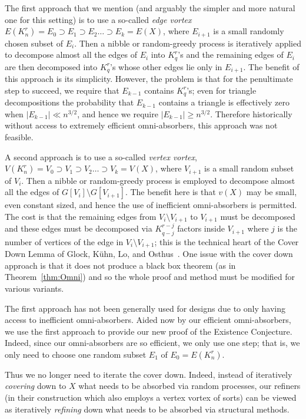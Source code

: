 \documentclass[11pt]{article}
\newcounter{i}
\theoremstyle{plain}
\theoremstyle{plain} %
\theoremstyle{definition}
\begin{document}
The first approach that we mention (and arguably the simpler and more natural one for this setting) is to use a so-called \emph{edge vortex} $E(K_n^r)=E_0 \supset E_1 \supset E_2 \ldots \supset E_k = E(X)$, where $E_{i+1}$ is a small randomly chosen subset of $E_{i}$. Then a nibble or random-greedy process is iteratively applied to decompose almost all the edges of $E_i$ into $K_q^r$'s and the remaining edges of $E_i$ are then decomposed into $K_q^r$'s whose other edges lie only in $E_{i+1}$. The benefit of this approach is its simplicity.  However, the problem is that for the penultimate step to succeed, we require that $E_{k-1}$ contains $K_q^r$'s; even for triangle decompositions the probability that $E_{k-1}$ contains a triangle is effectively zero when $|E_{k-1}| \ll n^{3/2}$, and hence we require $|E_{k-1}| \ge n^{3/2}$. %
Therefore historically without access to extremely efficient omni-absorbers, this approach was not feasible.

A second approach is to use a so-called \emph{vertex vortex}, $V(K_n^r) = V_0 \supset V_1 \supset V_2 \ldots \supset V_k = V(X)$, where $V_{i+1}$ is a small random subset of $V_i$. Then a nibble or random-greedy process is employed to decompose almost all the edges of $G[V_i]\setminus G[V_{i+1}]$. The benefit here is that $v(X)$ may be small, even constant sized, and hence the use of inefficient omni-absorbers is permitted. The cost is that the remaining edges from $V_i\setminus V_{i+1}$ to $V_{i+1}$ must be decomposed and these edges must be decomposed via $K_{q-j}^{r-j}$ factors inside $V_{i+1}$ where $j$ is the number of vertices of the edge in $V_i\setminus V_{i+1}$; this is the technical heart of the Cover Down Lemma of Glock, K\"{u}hn, Lo, and Osthus~\cite{GKLO16}. One issue with the cover down approach is that it does not produce a black box theorem (as in Theorem~\ref{thm:Omni}) and so the whole proof and method must be modified for various variants. 

The first approach has not been generally used for designs due to only having access to inefficient omni-absorbers. Aided now by our efficient omni-absorbers, we use the first approach to provide our new proof of the Existence Conjecture. Indeed, since our omni-absorbers are so efficient, we only use one step; that is, we only need to choose one random subset $E_1$ of $E_0=E(K_n^r)$. 

Thus we no longer need to iterate the cover down. Indeed, instead of iteratively \emph{covering} down to $X$ what needs to be absorbed via random processes, our refiners (in their construction which also employs a vertex vortex of sorts) can be viewed as iteratively \emph{refining} down  what needs to be absorbed via structural methods.
\end{document}
